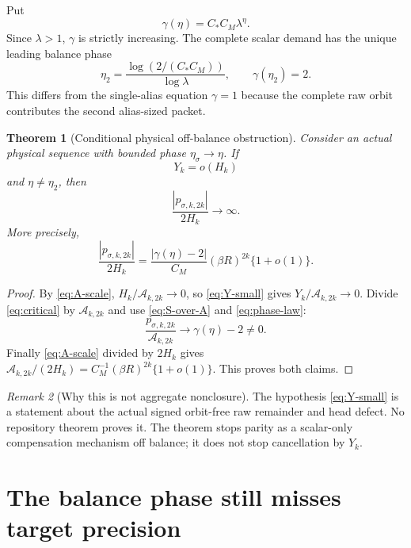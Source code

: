 \documentclass[11pt]{article}
\newtheorem{theorem}{Theorem}[section]
\theoremstyle{remark}
\newtheorem{remark}[theorem]{Remark}
\newcommand{\cA}{\mathcal A}
\begin{document}
Put
\begin{equation}\label{eq:gamma}
 \gamma(\eta)=C_*C_M\lambda^\eta.
\end{equation}
Since $\lambda>1$, $\gamma$ is strictly increasing.  The complete scalar
demand has the unique leading balance phase
\begin{equation}\label{eq:eta-two}
 \boxed{\eta_2=\frac{\log(2/(C_*C_M))}{\log\lambda}},
 \qquad \gamma(\eta_2)=2.
\end{equation}
This differs from the single-alias equation $\gamma=1$ because the complete
raw orbit contributes the second alias-sized packet.

\begin{theorem}[Conditional physical off-balance obstruction]
\label{thm:off-balance}
Consider an actual physical sequence with bounded phase
$\eta_\sigma\to\eta$.  If
\begin{equation}\label{eq:Y-small}
 Y_k=o(H_k)
\end{equation}
and $\eta\ne\eta_2$, then
\begin{equation}\label{eq:divergence}
 \frac{|p_{\sigma,k,2k}|}{2H_k}\longrightarrow\infty.
\end{equation}
More precisely,
\begin{equation}\label{eq:divergence-rate}
 \frac{|p_{\sigma,k,2k}|}{2H_k}
 =\frac{|\gamma(\eta)-2|}{C_M}
 (\beta R)^{2k}\{1+o(1)\}.
\end{equation}
\end{theorem}

\begin{proof}
By \eqref{eq:A-scale}, $H_k/\cA_{k,2k}\to0$, so
\eqref{eq:Y-small} gives $Y_k/\cA_{k,2k}\to0$.  Divide
\eqref{eq:critical} by $\cA_{k,2k}$ and use
\eqref{eq:S-over-A} and \eqref{eq:phase-law}:
\[
 \frac{p_{\sigma,k,2k}}{\cA_{k,2k}}
 \longrightarrow\gamma(\eta)-2\ne0.
\]
Finally \eqref{eq:A-scale} divided by $2H_k$ gives
$\cA_{k,2k}/(2H_k)=C_M^{-1}(\beta R)^{2k}\{1+o(1)\}$.
This proves both claims.
\end{proof}

\begin{remark}[Why this is not aggregate nonclosure]
The hypothesis \eqref{eq:Y-small} is a statement about the actual signed
orbit-free raw remainder and head defect.  No repository theorem proves it.
The theorem stops parity as a scalar-only compensation mechanism off balance;
it does not stop cancellation by $Y_k$.
\end{remark}

\section{The balance phase still misses target precision}
\end{document}
